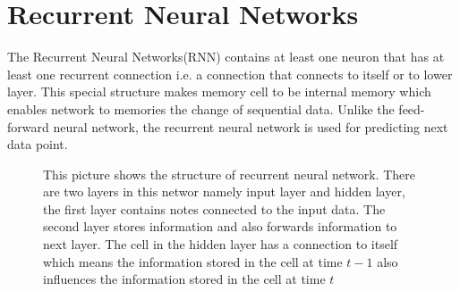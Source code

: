 \documentclass[officiallayout]{tktla}
\def\layersep{2.5cm}
\begin{document}
\section{Recurrent Neural Networks}
The Recurrent Neural Networks(RNN) contains at least one neuron that has at least one recurrent connection i.e. a connection that connects to itself or to lower layer. This special structure makes memory cell to be internal memory which enables network to memories the change of sequential data. Unlike the feed-forward neural network, the recurrent neural network is used for predicting next data point.

\begin{figure}[h!]
  \centering
  \caption{This picture shows the structure of recurrent neural network. There are two layers in this networ namely input layer and hidden layer, the first layer contains notes connected to the input data. The second layer stores information and also forwards information to next layer. The cell in the hidden layer has a connection to itself which means the information stored in the cell at time $t-1$ also influences the information stored in the cell at time $t$}\label{feedforward_nn}
\end{figure}
\end{document}
